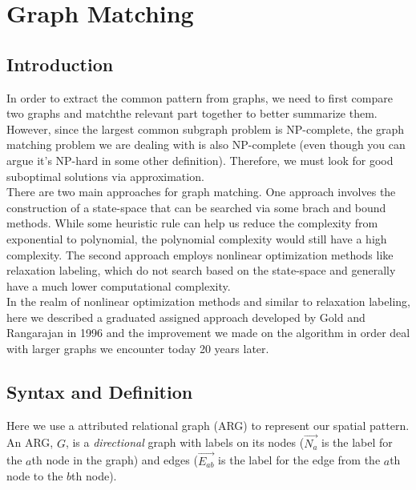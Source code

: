 \chapter{Graph Matching}
\label{chap: graphmatching}

\section{Introduction}

In order to extract the common pattern from graphs, we need to first compare two graphs and match\footnotemark the relevant part together to better summarize them. However, since the largest common subgraph problem is NP-complete, the graph matching problem we are dealing with is also NP-complete (even though you can argue it's NP-hard in some other definition). Therefore, we must look for good suboptimal solutions via approximation.
\\

There are two main approaches for graph matching. One approach involves the construction of a state-space that can be searched via some brach and bound methods. While some heuristic rule can help us reduce the complexity from exponential to polynomial, the polynomial complexity would still have a high complexity. The second approach employs nonlinear optimization methods like relaxation labeling, which do not search based on the state-space and generally have a much lower computational complexity.\\

In the realm of nonlinear optimization methods and similar to relaxation labeling, here we described a graduated assigned approach developed by Gold and Rangarajan in 1996 and the improvement we made on the algorithm in order deal with larger graphs we encounter today 20 years later.

\section{Syntax and Definition}

Here we use a attributed relational graph (ARG) to represent our spatial pattern. An ARG, $G$, is a \emph{directional} graph with labels on its nodes ($\overrightarrow{N_{a}}$ is the label for the $a$th node in the graph) and edges ($\overrightarrow{E_{ab}}$ is the label for the edge from the $a$th node to the $b$th node). \\

